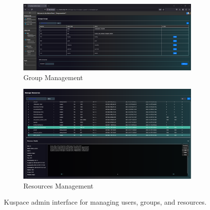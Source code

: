 \begin{figure}[!htbp]
    \begin{subfigure}[b]{0.48\textwidth}
        \includegraphics[width=\textwidth]{Images/kuspace_admin_ManageGroups.png}
        \caption{Group Management}
        \label{fig:adminmanagegroups}
    \end{subfigure}
    \hfill
    \begin{subfigure}[b]{0.48\textwidth}
        \includegraphics[width=\textwidth]{Images/kuspace_admin_ManageResources.png}
        \caption{Resources Management}
        \label{fig:adminmanageresources}
    \end{subfigure}

    \caption{Kuspace admin interface for managing users, groups, and resources.}
\end{figure}
\vspace{0.5em}
\noindent

\vspace{1em}

